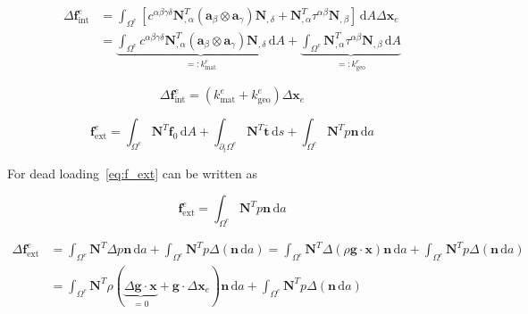 \documentclass[../main.tex]{subfiles}
\begin{document}
\begin{equation}\label{eq:del_f_int_2}
    \begin{split}
        \Delta \mathbf{f}_{\mathrm{int}}^{e} &= \int_{\Omega^{e}} \left[ c^{\alpha \beta \gamma \delta} \mathbf{N}_{, \alpha}^{T} \left( \boldsymbol{a}_{\beta} \otimes \boldsymbol{a}_{\gamma} \right) \mathbf{N}_{, \delta} + \mathbf{N}_{, \alpha}^{T} \tau^{\alpha \beta} \mathbf{N}_{, \beta} \right] \, \mathrm{d} A \Delta \mathbf{x}_{e} \\ &= \underbrace{\int_{\Omega^{e}} c^{\alpha \beta \gamma \delta} \mathbf{N}_{, \alpha}^{T} \left( \boldsymbol{a}_{\beta} \otimes \boldsymbol{a}_{\gamma} \right) \mathbf{N}_{, \delta} \, \mathrm{d} A}_{=: k_{\mathrm{mat}}^{e}} + \underbrace{\int_{\Omega^{e}} \mathbf{N}_{,\alpha}^{T} \tau^{\alpha \beta} \mathbf{N}_{, \beta} \, \mathrm{d} A}_{=: k_{\mathrm{geo}}^{e}}
    \end{split}
\end{equation}

\begin{equation}\label{eq:del_f_int_3}
\Delta \mathbf{f}_{\mathrm{int}}^{e} = \left( k_{\mathrm{mat}}^{e} + k_{\mathrm{geo}}^{e} \right) \Delta \mathbf{x}_{e}
\end{equation}

\begin{equation}\label{eq:f_ext}
    \mathbf{f}_{\mathrm{ext}}^{e} = \int_{\Omega^{e}} \mathbf{N}^{T} \boldsymbol{f}_{0} \, \mathrm{d} A + \int_{\partial_{t} \Omega^{e}} \mathbf{N}^{T} \overline{\boldsymbol{t}} \, \mathrm{d} s + \int_{\Omega^{e}} \mathbf{N}^{T} p \boldsymbol{n} \, \mathrm{d} a
\end{equation}

For dead loading~\eqref{eq:f_ext} can be written as

\begin{equation}\label{eq:f_ext_dead}
\mathbf{f}_{\mathrm{ext}}^{e} = \int_{\Omega^{e}} \mathbf{N}^{T} p \boldsymbol{n} \, \mathrm{d} a
\end{equation}

\begin{equation}\label{eq:del_f_ext_dead}
    \begin{split}
    \Delta \mathbf{f}_{\mathrm{ext}}^{e} &= \int_{\Omega^{e}} \mathbf{N}^{T} \Delta p \boldsymbol{n} \, \mathrm{d}a + \int_{\Omega^{e}} \mathbf{N}^{T} p \Delta \left( \boldsymbol{n}\, \mathrm{d} a \right) = \int_{\Omega^{e}} \mathbf{N}^{T} \Delta \left( \rho \boldsymbol{g} \cdot \boldsymbol{x} \right) \boldsymbol{n} \, \mathrm{d} a + \int_{\Omega^{e}} \mathbf{N}^{T} p \Delta \left( \boldsymbol{n} \, \mathrm{d} a \right) \\ &= \int_{\Omega^{e}} \mathbf{N}^{T} \rho \left( \underbrace{\Delta \boldsymbol{g} \cdot \boldsymbol{x}}_{= 0} + \boldsymbol{g} \cdot \Delta \boldsymbol{x}_{e} \right) \boldsymbol{n} \, \mathrm{d} a + \int_{\Omega^{e}} \mathbf{N}^{T} p \Delta \left( \boldsymbol{n} \, \mathrm{d} a \right) 
    \end{split}
\end{equation}
\end{document}
